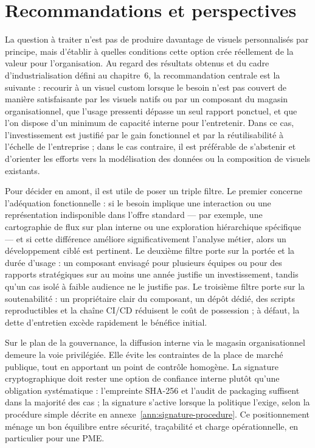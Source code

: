 \section{Recommandations et perspectives}
\label{sec:chap8-recommandations}

La question à traiter n’est pas de produire davantage de visuels personnalisés par principe, mais d’établir à quelles conditions cette option crée réellement de la valeur pour l’organisation. Au regard des résultats obtenus et du cadre d’industrialisation défini au chapitre~6, la recommandation centrale est la suivante : recourir à un visuel custom lorsque le besoin n’est pas couvert de manière satisfaisante par les visuels natifs ou par un composant du magasin organisationnel, que l’usage pressenti dépasse un seul rapport ponctuel, et que l’on dispose d’un minimum de capacité interne pour l’entretenir. Dans ce cas, l’investissement est justifié par le gain fonctionnel et par la réutilisabilité à l’échelle de l’entreprise ; dans le cas contraire, il est préférable de s’abstenir et d’orienter les efforts vers la modélisation des données ou la composition de visuels existants.

Pour décider en amont, il est utile de poser un triple filtre. Le premier concerne l’adéquation fonctionnelle : si le besoin implique une interaction ou une représentation indisponible dans l’offre standard — par exemple, une cartographie de flux sur plan interne ou une exploration hiérarchique spécifique — et si cette différence améliore significativement l’analyse métier, alors un développement ciblé est pertinent. Le deuxième filtre porte sur la portée et la durée d’usage : un composant envisagé pour plusieurs équipes ou pour des rapports stratégiques sur au moins une année justifie un investissement, tandis qu’un cas isolé à faible audience ne le justifie pas. Le troisième filtre porte sur la soutenabilité : un propriétaire clair du composant, un dépôt dédié, des scripts reproductibles et la chaîne CI/CD réduisent le coût de possession ; à défaut, la dette d’entretien excède rapidement le bénéfice initial.

Sur le plan de la gouvernance, la diffusion interne via le magasin organisationnel demeure la voie privilégiée. Elle évite les contraintes de la place de marché publique, tout en apportant un point de contrôle homogène. La signature cryptographique doit rester une option de confiance interne plutôt qu’une obligation systématique : l’empreinte SHA-256 et l’audit de packaging suffisent dans la majorité des cas ; la signature s’active lorsque la politique l’exige, selon la procédure simple décrite en annexe~\ref{ann:signature-procedure}. Ce positionnement ménage un bon équilibre entre sécurité, traçabilité et charge opérationnelle, en particulier pour une PME.

